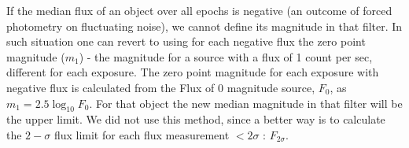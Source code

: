 \documentclass[fleqn,usenatbib]{mnras}  %
\begin{document}
If the median flux of an object over all epochs  is negative (an outcome of forced photometry on fluctuating noise), we cannot define its magnitude in that filter.  In such situation one can revert to  using for each negative flux the zero point magnitude ($m_1$) - the magnitude for a source with a flux of 1 count per sec, different for each exposure.  The zero point magnitude for each exposure with negative flux is calculated from the  Flux of 0 magnitude source,  $F_0$,  as  $m_{1} = 2.5 \log_{10}{F_{0}}$. For that object the new median magnitude in that filter will be the upper limit. We did not use this method, since a better way is to calculate the $2-\sigma$ flux limit for each flux measurement $< 2 \sigma$ : $F_{2\sigma}$. 




%



\bsp	%
\label{lastpage}
\end{document}
